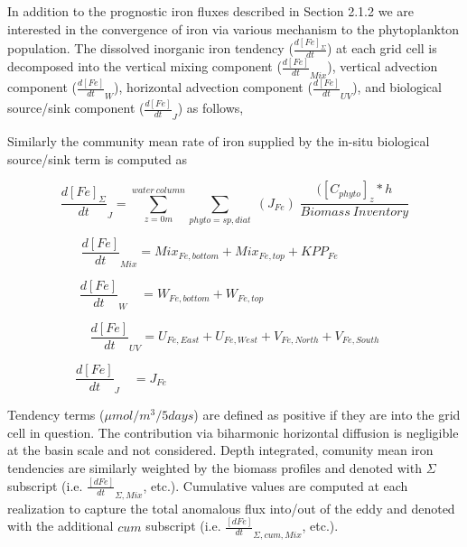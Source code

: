 In addition to the prognostic iron fluxes described in Section 2.1.2 we are interested in the convergence of iron via various mechanism to the phytoplankton population. The dissolved inorganic iron tendency ($\frac{d[Fe]_\Sigma}{dt}$) at each grid cell is decomposed into the vertical mixing component ($\frac{d[Fe]}{dt}_{Mix}$), vertical advection component ($\frac{d[Fe]}{dt}_{W}$), horizontal advection component ($\frac{d[Fe]}{dt}_{UV}$), and biological source/sink component ($\frac{d[Fe]}{dt}_{J}$) as follows,



Similarly the community mean rate of iron supplied by the in-situ biological source/sink term is computed as

\begin{equation}
    \frac{d[Fe]_\Sigma}{dt}_{J} = \sum_{z=0m}^{water \ column} \sum_{phyto = sp, diat} \; (J_{Fe}) \; \frac{([C_{phyto}]_z*h}{Biomass \ Inventory }
\end{equation}


\begin{equation}
    \frac{d[Fe]}{dt}_{Mix}  = Mix_{Fe,bottom} + Mix_{Fe,top} + KPP_{Fe} \qquad \qquad
\end{equation}

\begin{equation}
    \frac{d[Fe]}{dt}_{W} \quad = W_{Fe,bottom} + W_{Fe,top} \qquad \qquad \qquad \qquad \quad \quad
\end{equation}

\begin{equation}
    \frac{d[Fe]}{dt}_{UV} = U_{Fe, East} + U_{Fe, West} + V_{Fe, North} + V_{Fe, South}
\end{equation}

\begin{equation}
    \frac{d[Fe]}{dt}_{J} \quad   = J_{Fe} \qquad \qquad \qquad \qquad \qquad  \qquad \qquad \quad \qquad \quad
\end{equation}

Tendency terms ($\mu mol/m^3/5 days$) are defined as positive if they are into the grid cell in question. The contribution via biharmonic horizontal diffusion is negligible at the basin scale \parencite{Longrolemesoscaleeddies2018} and not considered. Depth integrated, comunity mean iron tendencies are similarly weighted by the biomass profiles and denoted with $\Sigma$ subscript (i.e. $\frac{[dFe]}{dt}_{\Sigma, Mix}$, etc.). Cumulative values are computed at each realization to capture the total anomalous flux into/out of the eddy and denoted with the additional $cum$ subscript (i.e. $\frac{[dFe]}{dt}_{\Sigma, cum, Mix}$, etc.).


